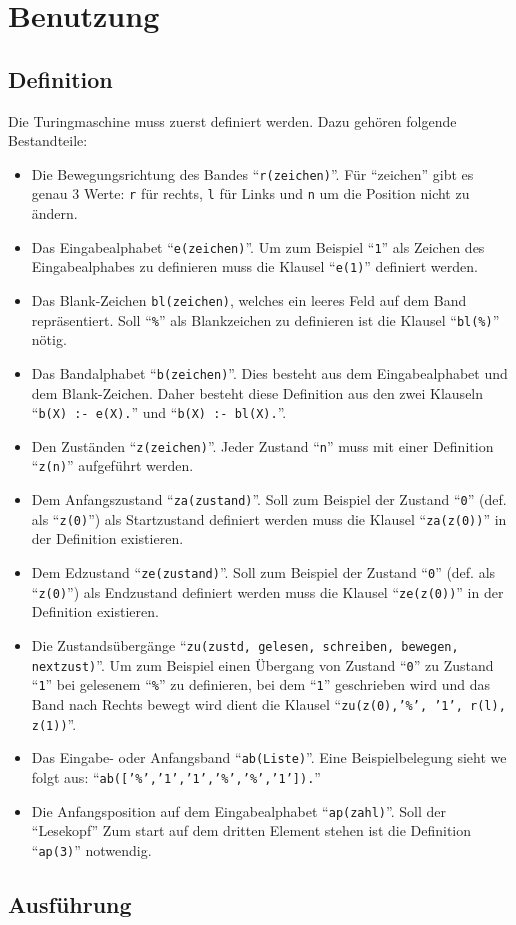 \documentclass[final,a4paper,11pt,notitlepage,halfparskip]{scrreprt}
\begin{document}
\chapter{Benutzung}

\section{Definition}
Die Turingmaschine muss zuerst definiert werden. Dazu gehören folgende
Bestandteile:
\begin{itemize}
    \item Die Bewegungsrichtung des Bandes "`\texttt{r(zeichen)}"'. Für
	"`zeichen"' gibt es genau 3 Werte: \texttt{r} für rechts,
	\texttt{l} für Links und \texttt{n} um die Position nicht zu
	ändern.
    \item Das Eingabealphabet "`\texttt{e(zeichen)}"'. Um zum Beispiel
	"`\texttt{1}"' als Zeichen des Eingabealphabes zu definieren
	muss die Klausel "`\texttt{e(1)}"' definiert werden.
    \item Das Blank-Zeichen \texttt{bl(zeichen)}, welches ein leeres
	Feld auf dem Band repräsentiert. Soll "`\texttt{\%}"' als
	Blankzeichen zu definieren ist die Klausel "`\texttt{bl(\%)}"'
	nötig.	
    \item Das Bandalphabet "`\texttt{b(zeichen)}"'. Dies besteht aus 
	dem Eingabealphabet und dem Blank-Zeichen. Daher besteht diese 
	Definition aus den zwei Klauseln "`\texttt{b(X) :- e(X).}"' 
	und "`\texttt{b(X) :- bl(X).}"'.
    \item Den Zuständen "`\texttt{z(zeichen)}"'. Jeder Zustand
	"`\texttt{n}"' muss mit einer Definition "`\texttt{z(n)}"' 
	aufgeführt werden.	
    \item Dem Anfangszustand "`\texttt{za(zustand)}"'. Soll zum 
	Beispiel der Zustand "`\texttt{0}"' (def. als "`\texttt{z(0)}"') 
	als Startzustand definiert werden muss die Klausel
	"`\texttt{za(z(0))}"' in der Definition existieren.
    \item Dem Edzustand "`\texttt{ze(zustand)}"'. Soll zum 
	Beispiel der Zustand "`\texttt{0}"' (def. als "`\texttt{z(0)}"') 
	als Endzustand definiert werden muss die Klausel
	"`\texttt{ze(z(0))}"' in der Definition existieren.
    \item Die Zustandsübergänge 
	"`\texttt{zu(zustd, gelesen, schreiben, bewegen, nextzust)}"'.
	Um zum Beispiel einen Übergang von Zustand "`\texttt{0}"' zu
	Zustand "`\texttt{1}"' bei gelesenem "`\texttt{\%}"' zu
	definieren, bei dem "`\texttt{1}"' geschrieben wird und das Band
	nach Rechts bewegt wird dient die Klausel 
	"`\texttt{zu(z(0),'\%', '1',  r(l), z(1))}"'.
    \item Das Eingabe- oder Anfangsband "`\texttt{ab(Liste)}"'. Eine
	Beispielbelegung sieht we folgt aus:
	"`\texttt{ab(['\%','1','1','\%','\%','1']).}"'	
    \item Die Anfangsposition auf dem Eingabealphabet
	"`\texttt{ap(zahl)}"'. Soll der "`Lesekopf"' Zum start auf dem
	dritten Element stehen ist die Definition "`\texttt{ap(3)}"'
	notwendig.	
\end{itemize}

\section{Ausführung}
\end{document}
